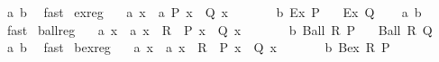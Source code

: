 \begin{isabellebody}
\isamarkupfalse%
\ a\ b\ \isamarkupfalse%
\ fast%
\endisatagproof
{\isafoldproof}%
%
\isadelimproof
\isanewline
%
\endisadelimproof
\isanewline
{}\isamarkupfalse%
\ ex{\isacharunderscore}{\kern0pt}reg{\isacharcolon}{\kern0pt}\isanewline
\ \ \ a{\isacharcolon}{\kern0pt}\ {\isachardoublequoteopen}{\isasymforall}x\ {\isacharcolon}{\kern0pt}{\isacharcolon}{\kern0pt}\ {\isacharprime}{\kern0pt}a{\isachardot}{\kern0pt}\ {\isacharparenleft}{\kern0pt}P\ x\ {\isasymlongrightarrow}\ Q\ x{\isacharparenright}{\kern0pt}{\isachardoublequoteclose}\isanewline
\ \ \ \ \ \ \ b{\isacharcolon}{\kern0pt}\ {\isachardoublequoteopen}Ex\ P{\isachardoublequoteclose}\isanewline
\ \ \ {\isachardoublequoteopen}Ex\ Q{\isachardoublequoteclose}\isanewline
%
\isadelimproof
\ \ %
\endisadelimproof
%
\isatagproof
{}\isamarkupfalse%
\ a\ b\ \isamarkupfalse%
\ fast%
\endisatagproof
{\isafoldproof}%
%
\isadelimproof
\isanewline
%
\endisadelimproof
\isanewline
{}\isamarkupfalse%
\ ball{\isacharunderscore}{\kern0pt}reg{\isacharcolon}{\kern0pt}\isanewline
\ \ \ a{\isacharcolon}{\kern0pt}\ {\isachardoublequoteopen}{\isasymforall}x\ {\isacharcolon}{\kern0pt}{\isacharcolon}{\kern0pt}\ {\isacharprime}{\kern0pt}a{\isachardot}{\kern0pt}\ {\isacharparenleft}{\kern0pt}x\ {\isasymin}\ R\ {\isasymlongrightarrow}\ P\ x\ {\isasymlongrightarrow}\ Q\ x{\isacharparenright}{\kern0pt}{\isachardoublequoteclose}\isanewline
\ \ \ \ \ \ \ b{\isacharcolon}{\kern0pt}\ {\isachardoublequoteopen}Ball\ R\ P{\isachardoublequoteclose}\isanewline
\ \ \ {\isachardoublequoteopen}Ball\ R\ Q{\isachardoublequoteclose}\isanewline
%
\isadelimproof
\ \ %
\endisadelimproof
%
\isatagproof
{}\isamarkupfalse%
\ a\ b\ \isamarkupfalse%
\ fast%
\endisatagproof
{\isafoldproof}%
%
\isadelimproof
\isanewline
%
\endisadelimproof
\isanewline
{}\isamarkupfalse%
\ bex{\isacharunderscore}{\kern0pt}reg{\isacharcolon}{\kern0pt}\isanewline
\ \ \ a{\isacharcolon}{\kern0pt}\ {\isachardoublequoteopen}{\isasymforall}x\ {\isacharcolon}{\kern0pt}{\isacharcolon}{\kern0pt}\ {\isacharprime}{\kern0pt}a{\isachardot}{\kern0pt}\ {\isacharparenleft}{\kern0pt}x\ {\isasymin}\ R\ {\isasymlongrightarrow}\ P\ x\ {\isasymlongrightarrow}\ Q\ x{\isacharparenright}{\kern0pt}{\isachardoublequoteclose}\isanewline
\ \ \ \ \ \ \ b{\isacharcolon}{\kern0pt}\ {\isachardoublequoteopen}Bex\ R\ P{\isachardoublequoteclose}\isanewline

\end{isabellebody}
